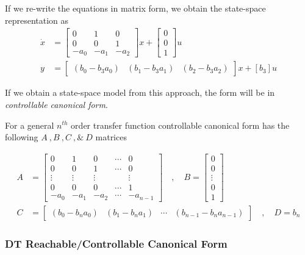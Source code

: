 \documentclass[twoside]{article}
\begin{document}
%
If we re-write the equations in matrix form, we obtain the state-space representation as
%
\begin{align*}
	\dot{x} &= \left[ \begin{array}{ccc} 0 & 1 & 0  \\  0 & 0 & 1 \\  -a_0 & -a_1 & -a_2 \end{array} \right] x 
	+ \left[ \begin{array}{c} 0 \\ 0 \\ 1 \end{array} \right] u
	\\
	y &= \left[ \begin{array}{ccc} ( b_0 - b_3 a_0 ) & ( b_1 - b_3 a_1 )  & ( b_2 - b_3 a_2 ) \end{array} \right] x
	+ \left[ b_3 \right] u
\end{align*}

If we obtain a state-space model from this approach, the form
will be in \textit{controllable canonical form}.  

For a general $n^{th}$ order transfer function controllable
canonical form has the following $A \ ,  B \ ,  C \ , \& \ D$
matrices

\begin{align*}
A &= \left[ \begin{array}{ccccc} 0 & 1 & 0 & \cdots & 0 \\ 0 & 0 & 1 &
                                                                      \cdots & 0
\\ \vdots & \vdots & \vdots & & \vdots
\\ 0 & 0 & 0 & \cdots & 1
    \\ -a_0 & -a_1 & -a_2 & \cdots & -a_{n-1} \end{array} \right]
\quad , \quad 
B = \left[ \begin{array}{c} 0\\ 0 \\ \vdots \\ 0
    \\ 1 \end{array} \right]
\\ C &= \left[ \begin{array}{cccc} (b_0 - b_n a_0) 
  &  (b_1 - b_n a_1) & \cdots & (b_{n-1} - b_n a_{n-1}) \end{array} \right]
\quad , \quad
D = b_n
\end{align*}

\subsubsection{DT Reachable/Controllable Canonical Form}
\end{document}
